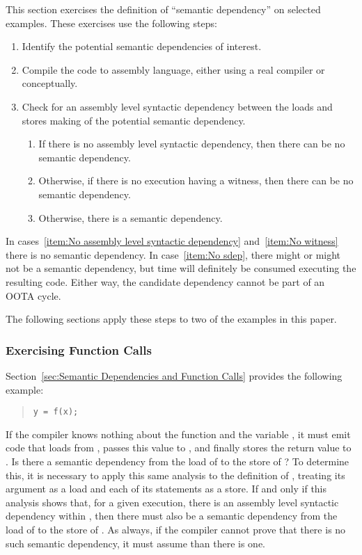 This section exercises the definition of ``semantic dependency'' on
selected examples.
These exercises use the following steps:

\begin{enumerate}
\item	Identify the potential semantic dependencies of interest.
\item	Compile the code to assembly language, either using a
	real compiler or conceptually.
\item	Check for an assembly level syntactic dependency between
	the loads and stores making of the potential semantic
	dependency.
	\begin{enumerate}
	\item	If there is no assembly level syntactic dependency,
		then there can be no semantic
		dependency.\label{item:No assembly level syntactic dependency}
	\item	Otherwise, if there is no execution having a witness,
		then there can be no semantic
		dependency.\label{item:No witness}
	\item	Otherwise, there is a semantic
		dependency.\label{item:No sdep}
	\end{enumerate}
\end{enumerate}

In cases~\ref{item:No assembly level syntactic dependency}
and~\ref{item:No witness}
there is no semantic dependency.
In case~\ref{item:No sdep},
there might or might not be a semantic dependency, but
time will definitely be consumed executing the resulting code.
Either way, the candidate dependency cannot be part of an OOTA
cycle.

The following sections apply these steps to two of the examples in
this paper.

\subsubsection{Exercising Function Calls}
\label{sec:Exercising Function Calls}

Section~\ref{sec:Semantic Dependencies and Function Calls}
provides the following example:
\begin{quote}
\begin{verbatim}
y = f(x);
\end{verbatim}
\end{quote}
If the compiler knows nothing about the function  and the variable
, it must emit code that loads from , passes this value to
, and finally stores the return value to .
Is there a semantic dependency from the load of  to the store of
?
To determine this, it is necessary to apply this same analysis to the
definition of , treating its argument as a load and each of its
 statements as a store.
If and only if this analysis shows that, for a given execution, there
is an assembly level syntactic dependency within , then there
must also be a semantic dependency from the load of  to the store
of .
As always, if the compiler cannot prove that there is no such semantic
dependency, it must assume than there is one.

